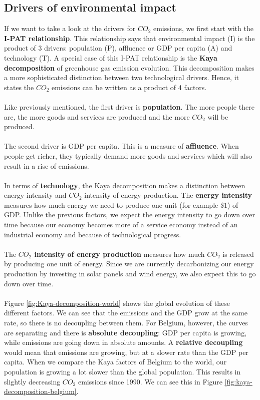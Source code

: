 \documentclass[../summary.tex]{subfiles}
\begin{document}
	\subsection{Drivers of environmental impact}
	
	If we want to take a look at the drivers for $CO_{2}$ emissions, we first start with the \textbf{I-PAT relationship}. This relationship says that environmental impact (I) is the product of 3 drivers: population (P), affluence or GDP per capita (A) and technology (T). A special case of this I-PAT relationship is the \textbf{Kaya decomposition} of greenhouse gas emission evolution. This decomposition makes a more sophisticated distinction between two technological drivers. Hence, it states the $CO_{2}$ emissions can be written as a product of 4 factors.
	\\\\
	Like previously mentioned, the first driver is \textbf{population}. The more people there are, the more goods and services are produced and the more $CO_{2}$ will be produced. 
	\\\\
	The second driver is GDP per capita. This is a measure of \textbf{affluence}. When people get richer, they typically demand more goods and services which will also result in a rise of emissions.
	\\\\
	In terms of \textbf{technology}, the Kaya decomposition makes a distinction between energy intensity and $CO_{2}$ intensity of energy production. The \textbf{energy intensity} measures how much energy we need to produce one unit (for example \$1) of GDP. Unlike the previous factors, we expect the energy intensity to go down over time because our economy becomes more of a service economy instead of an industrial economy and because of technological progress. \\\\
	The \textbf{\boldmath $CO_{2}$ intensity of energy production} measures how much $CO_{2}$ is released by producing one unit of energy. Since we are currently decarbonizing our energy production by investing in solar panels and wind energy, we also expect this to go down over time.
	\\\\
	Figure \ref{fig:Kaya-decomposition-world} shows the global evolution of these different factors. We can see that the emissions and the GDP grow at the same rate, so there is no decoupling between them. For Belgium, however, the curves are separating and there is \textbf{absolute decoupling}: GDP per capita is growing, while emissions are going down in absolute amounts. A \textbf{relative decoupling} would mean that emissions are growing, but at a slower rate than the GDP per capita. When we compare the Kaya factors of Belgium to the world, our population is growing a lot slower than the global population. This results in slightly decreasing $CO_{2}$ emissions since 1990. We can see this in Figure \ref{fig:kaya-decomposition-belgium}.
	
\end{document}
